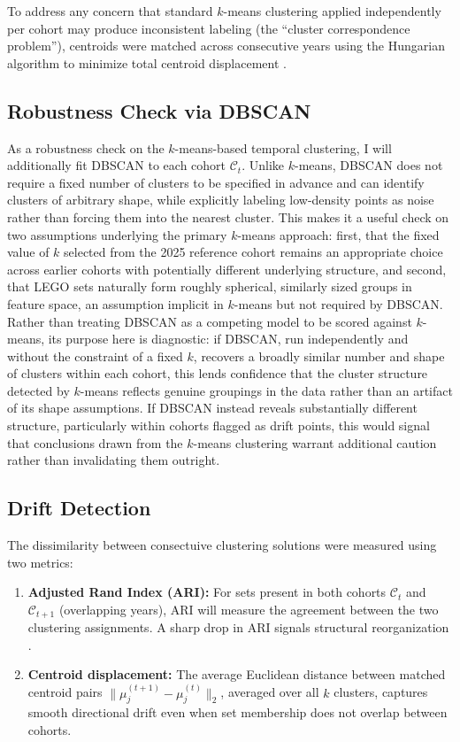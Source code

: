 \documentclass[11pt, letterpaper]{article}
\begin{document}
To address any concern that standard $k$-means clustering applied independently per cohort may produce inconsistent labeling (the ``cluster correspondence problem''), centroids were matched across consecutive years using the Hungarian algorithm to minimize total centroid displacement \cite{kuhn1955hungarian}.

\subsection{Robustness Check via DBSCAN}

As a robustness check on the $k$-means-based temporal clustering, I will additionally fit DBSCAN \cite{ester1996dbscan} to each cohort $\mathcal{C}_t$. Unlike $k$-means, DBSCAN does not require a fixed number of clusters to be specified in advance and can identify clusters of arbitrary shape, while explicitly labeling low-density points as noise rather than forcing them into the nearest cluster. This makes it a useful check on two assumptions underlying the primary $k$-means approach: first, that the fixed value of $k$ selected from the 2025 reference cohort remains an appropriate choice across earlier cohorts with potentially different underlying structure, and second, that LEGO sets naturally form roughly spherical, similarly sized groups in feature space, an assumption implicit in $k$-means but not required by DBSCAN. Rather than treating DBSCAN as a competing model to be scored against $k$-means, its purpose here is diagnostic: if DBSCAN, run independently and without the constraint of a fixed $k$, recovers a broadly similar number and shape of clusters within each cohort, this lends confidence that the cluster structure detected by $k$-means reflects genuine groupings in the data rather than an artifact of its shape assumptions. If DBSCAN instead reveals substantially different structure, particularly within cohorts flagged as drift points, this would signal that conclusions drawn from the $k$-means clustering warrant additional caution rather than invalidating them outright.

\subsection{Drift Detection}

The dissimilarity between consectuive clustering solutions were measured using two metrics:

\begin{enumerate}
    \item \textbf{Adjusted Rand Index (ARI):} For sets present in both cohorts $\mathcal{C}_t$ and $\mathcal{C}_{t+1}$ (overlapping years), ARI will measure the agreement between the two clustering assignments. A sharp drop in ARI signals structural reorganization \cite{mishra2025cluster}.
    \item \textbf{Centroid displacement:} The average Euclidean distance between matched centroid pairs $\|\mu_j^{(t+1)} - \mu_j^{(t)}\|_2$, averaged over all $k$ clusters, captures smooth directional drift even when set membership does not overlap between cohorts.
\end{enumerate}
\end{document}
